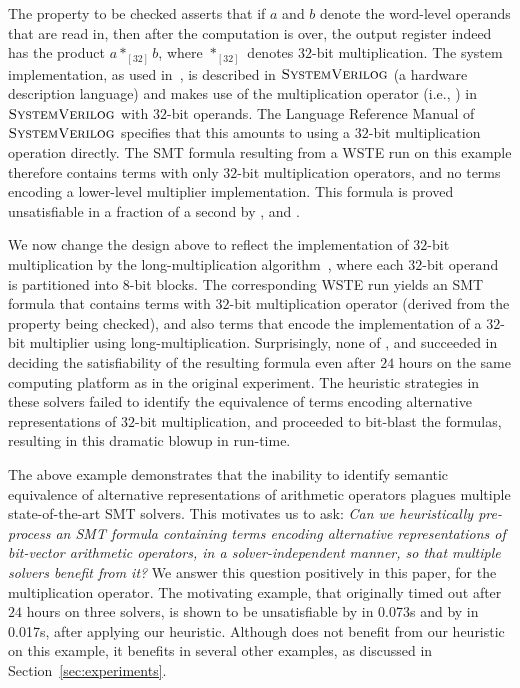 The property to be checked asserts that if $a$ and $b$ denote the
word-level operands that are read in, then after the computation is
over, the output register indeed has the product $a *_{[32]} b$, where
$*_{[32]}$ denotes $32$-bit multiplication.  The system implementation,
as used in~\cite{wste}, is described in $\textsc{SystemVerilog}$ (a hardware description
language) and makes use of the multiplication operator (i.e., {\tt *}) in
$\textsc{SystemVerilog}$ with $32$-bit operands.  The Language Reference Manual of
$\textsc{SystemVerilog}$ specifies that this amounts to using a $32$-bit
multiplication operation directly.  The SMT formula resulting from a
WSTE run on this example therefore contains terms with only $32$-bit
multiplication operators, and no terms encoding a lower-level
multiplier implementation.  This formula is proved unsatisfiable
in a fraction of a second by {\boolector}, {\cvcfour}
and {\zthree}.%

We now change the design above to reflect the implementation of
$32$-bit multiplication by the long-multiplication
algorithm~\cite{long}, where each $32$-bit operand is partitioned into
$8$-bit blocks.  The corresponding WSTE run yields an SMT formula that
contains terms with $32$-bit multiplication operator (derived from the
property being checked), and also terms that encode the implementation
of a $32$-bit multiplier using long-multiplication.  Surprisingly,
none of {\boolector}, {\cvcfour} and {\zthree} succeeded in deciding
the satisfiability of the resulting formula even after $24$ hours on
the same computing platform as in the original experiment.  The
heuristic strategies in these solvers failed to identify the
equivalence of terms encoding alternative representations of $32$-bit
multiplication, and proceeded to bit-blast the formulas, resulting in this
dramatic blowup in run-time.

The above example demonstrates that the inability to identify semantic
equivalence of alternative representations of arithmetic operators
plagues multiple state-of-the-art SMT solvers.  %
This motivates us to ask: \emph{Can we heuristically pre-process an
SMT formula containing terms encoding alternative representations of
bit-vector arithmetic operators, in a solver-independent manner, so
that multiple solvers benefit from it?}  We answer this question
positively in this paper, for the multiplication operator.  The
motivating example, that originally timed out after $24$ hours on
three solvers, is shown to be unsatisfiable by {\zthree} in 0.073s and
by {\cvcfour} in 0.017s, after applying our heuristic. Although
{\boolector} does not benefit from our heuristic on this example,
it benefits in several other examples, as discussed in
Section~\ref{sec:experiments}.

